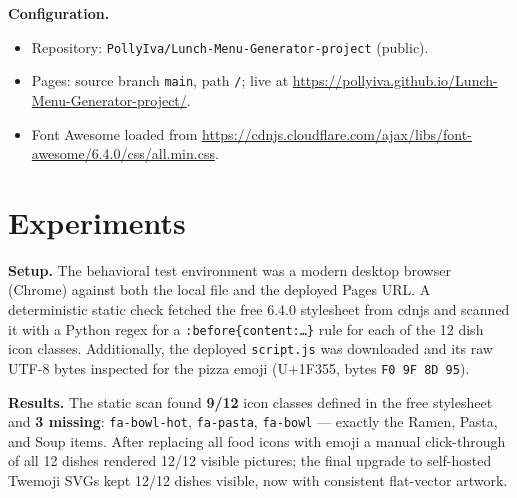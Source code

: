 \documentclass[11pt,a4paper]{article}
\begin{document}
\textbf{Configuration.}
\begin{itemize}[leftmargin=2em,itemsep=1pt]
  \item Repository: \texttt{PollyIva/Lunch-Menu-Generator-project} (public).
  \item Pages: source branch \texttt{main}, path \texttt{/}; live at
        \url{https://pollyiva.github.io/Lunch-Menu-Generator-project/}.
  \item Font Awesome loaded from
        \url{https://cdnjs.cloudflare.com/ajax/libs/font-awesome/6.4.0/css/all.min.css}.
\end{itemize}

\section{Experiments}

\textbf{Setup.} The behavioral test environment was a modern desktop browser (Chrome)
against both the local file and the deployed Pages URL. A deterministic static check
fetched the free 6.4.0 stylesheet from cdnjs and scanned it with a Python regex for a
\texttt{:before\{content:\ldots\}} rule for each of the 12 dish icon classes. Additionally,
the deployed \texttt{script.js} was downloaded and its raw UTF-8 bytes inspected for the
pizza emoji (U+1F355, bytes \texttt{F0 9F 8D 95}).

\textbf{Results.} The static scan found \textbf{9/12} icon classes defined in the free
stylesheet and \textbf{3 missing}: \texttt{fa-bowl-hot}, \texttt{fa-pasta}, \texttt{fa-bowl}
--- exactly the Ramen, Pasta, and Soup items. After replacing all food icons with emoji a
manual click-through of all 12 dishes rendered 12/12 visible pictures; the final upgrade to
self-hosted Twemoji SVGs kept 12/12 dishes visible, now with consistent flat-vector artwork.
\end{document}
